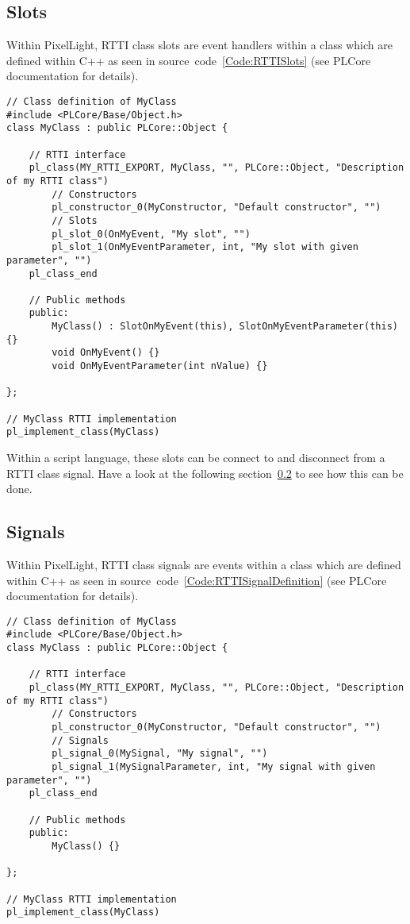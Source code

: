 \subsection{Slots}
\label{Script_RTTIObjects_Slots}
Within PixelLight, RTTI class slots are event handlers within a class which are defined within C++ as seen in source~code~\ref{Code:RTTISlots} (see PLCore documentation for details).
\begin{lstlisting}[label=Code:RTTISlots,caption={Definition of RTTI class slots with parameters (C++)}]
// Class definition of MyClass
#include <PLCore/Base/Object.h>
class MyClass : public PLCore::Object {

	// RTTI interface
	pl_class(MY_RTTI_EXPORT, MyClass, "", PLCore::Object, "Description of my RTTI class")
		// Constructors
		pl_constructor_0(MyConstructor, "Default constructor", "")
		// Slots
		pl_slot_0(OnMyEvent, "My slot", "")
		pl_slot_1(OnMyEventParameter, int, "My slot with given parameter", "")
	pl_class_end

	// Public methods
	public:
		MyClass() : SlotOnMyEvent(this), SlotOnMyEventParameter(this) {}
		void OnMyEvent() {}
		void OnMyEventParameter(int nValue) {}

};

// MyClass RTTI implementation
pl_implement_class(MyClass)
\end{lstlisting}

Within a script language, these slots can be connect to and disconnect from a RTTI class signal. Have a look at the following section~\ref{Script_RTTIObjects_Signals} to see how this can be done.


\subsection{Signals}
\label{Script_RTTIObjects_Signals}
Within PixelLight, RTTI class signals are events within a class which are defined within C++ as seen in source~code~\ref{Code:RTTISignalDefinition} (see PLCore documentation for details).
\begin{lstlisting}[label=Code:RTTISignalDefinition,caption={Defining a RTTI class with signals (C++)}]
// Class definition of MyClass
#include <PLCore/Base/Object.h>
class MyClass : public PLCore::Object {

	// RTTI interface
	pl_class(MY_RTTI_EXPORT, MyClass, "", PLCore::Object, "Description of my RTTI class")
		// Constructors
		pl_constructor_0(MyConstructor, "Default constructor", "")
		// Signals
		pl_signal_0(MySignal, "My signal", "")
		pl_signal_1(MySignalParameter, int, "My signal with given parameter", "")
	pl_class_end

	// Public methods
	public:
		MyClass() {}

};

// MyClass RTTI implementation
pl_implement_class(MyClass)
\end{lstlisting}

